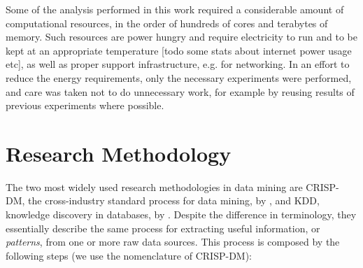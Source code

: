 \documentclass[a4paper]{book}
\begin{document}
Some of the analysis performed in this work required a considerable amount of computational resources, in the order of hundreds of cores and terabytes of memory. Such resources are power hungry and require electricity to run and to be kept at an appropriate temperature [todo some stats about internet power usage etc], as well as proper support infrastructure, e.g. for networking. In an effort to reduce the energy requirements, only the necessary experiments were performed, and care was taken not to do unnecessary work, for example by reusing results of previous experiments where possible.

\section{Research Methodology}
\label{sec:research_methodology}
The two most widely used research methodologies in data mining are CRISP-DM, the cross-industry standard process for data mining, by \cite{crispdm}, and KDD, knowledge discovery in databases, by \cite{kdd}. Despite the difference in terminology, they essentially describe the same process for extracting useful information, or \emph{patterns}, from one or more raw data sources. This process is composed by the following steps (we use the nomenclature of CRISP-DM):
\end{document}
